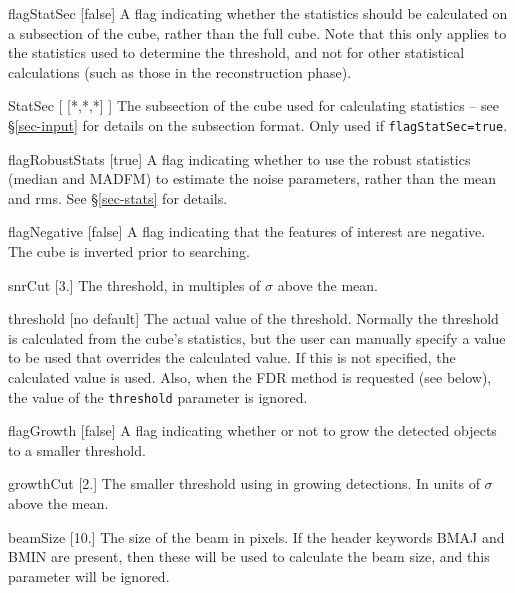 \begin{Lentry}
\item[{flagStatSec [false]}] A flag indicating whether the
  statistics should be calculated on a subsection of the cube, rather
  than the full cube. Note that this only applies to the statistics
  used to determine the threshold, and not for other statistical
  calculations (such as those in the reconstruction phase).
\item[{StatSec [ [*,*,*] ]}] The subsection of the cube used
  for calculating statistics -- see \S\ref{sec-input} for details on
 the subsection format. Only used if \texttt{flagStatSec=true}.
\item[{flagRobustStats [true]}] A flag indicating whether to use the
  robust statistics (median and MADFM) to estimate the noise
  parameters, rather than the mean and rms. See \S\ref{sec-stats} for
  details. 
\item[{flagNegative [false]}] A flag indicating that the
  features of interest are negative. The cube is inverted prior to
  searching.
\item[{snrCut [3.]}] The threshold, in multiples of $\sigma$ above
  the mean.
\item[{threshold [no default]}] The actual value of the
  threshold. Normally the threshold is calculated from the cube's
  statistics, but the user can manually specify a value to be used
  that overrides the calculated value. If this is not specified, the
  calculated value is used. Also, when the FDR method is requested
  (see below), the value of the \texttt{threshold} parameter is
  ignored.
\item[{flagGrowth [false]}] A flag indicating whether or not to
  grow the detected objects to a smaller threshold.
\item[{growthCut [2.]}] The smaller threshold using in growing
  detections. In units of $\sigma$ above the mean.
\item[{beamSize [10.]}] The size of the beam in pixels. If the
  header keywords BMAJ and BMIN are present, then these will be used
  to calculate the beam size, and this parameter will be ignored. 
\end{Lentry}


